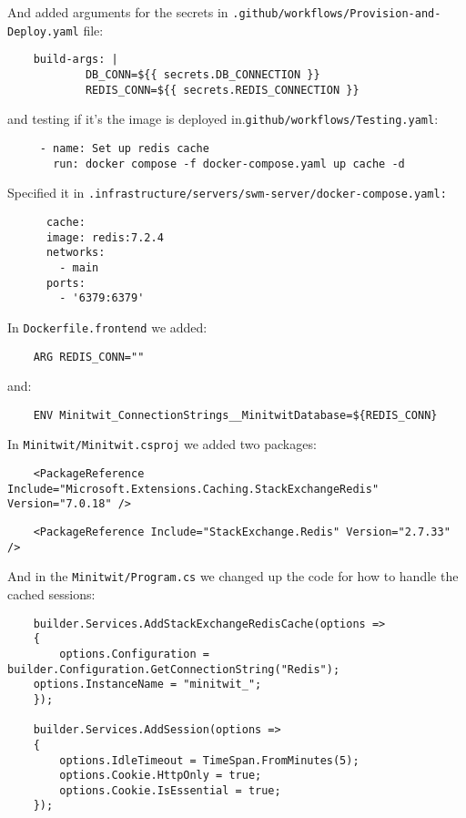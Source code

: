 And added arguments for the secrets in \texttt{.github/workflows/Provision-and-Deploy.yaml} file:

\begin{verbatim}
    build-args: |
            DB_CONN=${{ secrets.DB_CONNECTION }}
            REDIS_CONN=${{ secrets.REDIS_CONNECTION }}
\end{verbatim}

and testing if it's the image is deployed in.\texttt{github/workflows/Testing.yaml}:

\begin{verbatim}
     - name: Set up redis cache
       run: docker compose -f docker-compose.yaml up cache -d
\end{verbatim}

Specified it in \texttt{.infrastructure/servers/swm-server/docker-compose.yaml:}

\begin{verbatim}
      cache:
      image: redis:7.2.4
      networks:
        - main
      ports:
        - '6379:6379'
\end{verbatim}

In \texttt{Dockerfile.frontend} we added:

\begin{verbatim}
    ARG REDIS_CONN=""
\end{verbatim}

and:

\begin{verbatim}
    ENV Minitwit_ConnectionStrings__MinitwitDatabase=${REDIS_CONN}
\end{verbatim}

In \texttt{Minitwit/Minitwit.csproj} we added two packages:

\begin{verbatim}
    <PackageReference Include="Microsoft.Extensions.Caching.StackExchangeRedis" Version="7.0.18" />
\end{verbatim}

\begin{verbatim}
    <PackageReference Include="StackExchange.Redis" Version="2.7.33" />
\end{verbatim}

And in the \texttt{Minitwit/Program.cs} we changed up the code for how to handle the cached sessions:

\begin{verbatim}
    builder.Services.AddStackExchangeRedisCache(options =>
    {
	    options.Configuration = builder.Configuration.GetConnectionString("Redis");
    options.InstanceName = "minitwit_";
    });

    builder.Services.AddSession(options =>
    {
        options.IdleTimeout = TimeSpan.FromMinutes(5);
        options.Cookie.HttpOnly = true;
        options.Cookie.IsEssential = true;
    });
\end{verbatim}

